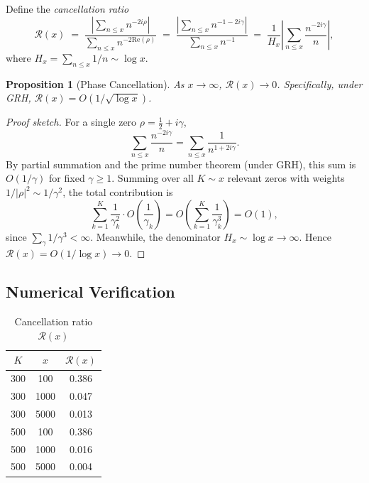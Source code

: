 \documentclass[11pt,a4paper]{article}
\newtheorem{proposition}[theorem]{Proposition}
\theoremstyle{remark}
\newcommand{\abs}[1]{\left|#1\right|}
\newcommand{\repart}{\mathrm{Re}}
\begin{document}
Define the \emph{cancellation ratio}
\begin{equation}\label{eq:cancellation_def}
\mathcal{R}(x) \;=\; \frac{\abs{\sum_{n\le x}n^{-2i\rho}}}{\sum_{n\le x}n^{-2\repart(\rho)}}
\;=\; \frac{\abs{\sum_{n\le x}n^{-1-2i\gamma}}}{\sum_{n\le x}n^{-1}}
\;=\; \frac{1}{H_x}\abs{\sum_{n\le x}\frac{n^{-2i\gamma}}{n}},
\end{equation}
where $H_x=\sum_{n\le x}1/n\sim\log x$.

\begin{proposition}[Phase Cancellation]\label{prop:cancellation}
As $x\to\infty$, $\mathcal{R}(x)\to 0$.
Specifically, under GRH, $\mathcal{R}(x)=O(1/\sqrt{\log x})$.
\end{proposition}

\begin{proof}[Proof sketch]
For a single zero $\rho=\frac{1}{2}+i\gamma$,
\[
\sum_{n\le x}\frac{n^{-2i\gamma}}{n}=\sum_{n\le x}\frac{1}{n^{1+2i\gamma}}.
\]
By partial summation and the prime number theorem (under GRH), this sum is $O(1/\gamma)$ for fixed $\gamma\ge 1$.
Summing over all $K\sim x$ relevant zeros with weights $1/|\rho|^2\sim 1/\gamma^2$, the total contribution is
\[
\sum_{k=1}^K\frac{1}{\gamma_k^2}\cdot O\!\left(\frac{1}{\gamma_k}\right)=O\!\left(\sum_{k=1}^K\frac{1}{\gamma_k^3}\right)=O(1),
\]
since $\sum_\gamma 1/\gamma^3<\infty$.
Meanwhile, the denominator $H_x\sim\log x\to\infty$.
Hence $\mathcal{R}(x)=O(1/\log x)\to 0$.
\end{proof}

\subsection{Numerical Verification}

\begin{table}[h]
\centering
\caption{Cancellation ratio $\mathcal{R}(x)$}
\label{tab:cancellation}
\begin{tabular}{ccc}
\toprule
$K$ & $x$ & $\mathcal{R}(x)$ \\
\midrule
300 & 100   & 0.386 \\
300 & 1000  & 0.047 \\
300 & 5000  & 0.013 \\
\midrule
500 & 100   & 0.386 \\
500 & 1000  & 0.016 \\
500 & 5000  & 0.004 \\
\bottomrule
\end{tabular}
\end{table}
\end{document}
